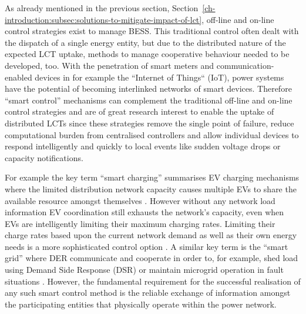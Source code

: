 
As already mentioned in the previous section, Section~\ref{ch-introduction:subsec:solutions-to-mitigate-impact-of-lct}, off-line and on-line control strategies exist to manage BESS.
This traditional control often dealt with the dispatch of a single energy entity, but due to the distributed nature of the expected LCT uptake, methods to manage cooperative behaviour needed to be developed, too.
With the penetration of smart meters and communication-enabled devices in for example the ``Internet of Things`` (IoT), power systems have the potential of becoming interlinked networks of smart devices.
Therefore ``smart control'' mechanisms can complement the traditional off-line and on-line control strategies and are of great research interest to enable the uptake of distributed LCTs since these strategies remove the single point of failure, reduce computational burden from centralised controllers and allow individual devices to respond intelligently and quickly to local events like sudden voltage drops or capacity notifications.

For example the key term ``smart charging'' summarises EV charging mechanisms where the limited distribution network capacity causes multiple EVs to share the available resource amongst themselves \cite{Sortomme2011, Vaya2012, Garcia-Villalobos2014}.
However without any network load information EV coordination still exhausts the network's capacity, even when EVs are intelligently limiting their maximum charging rates.
Limiting their charge rates based upon the current network demand as well as their own energy needs is a more sophisticated control option \cite{Karfopoulos2013}.
A similar key term is the ``smart grid'' where DER communicate and cooperate in order to, for example, shed load using Demand Side Response (DSR) or maintain microgrid operation in fault situations \cite{Samadi2012, Liu2014, Liang2014}.
However, the fundamental requirement for the successful realisation of any such smart control method is the reliable exchange of information amongst the participating entities that physically operate within the power network.


